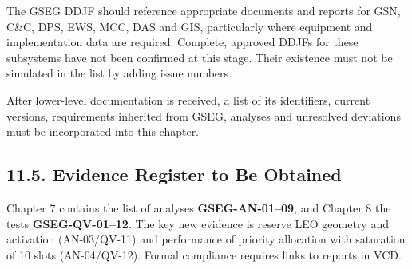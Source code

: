 The GSEG DDJF should reference appropriate documents and reports for GSN, C\&C, DPS, EWS, MCC, DAS and GIS, particularly where equipment and implementation data are required. Complete, approved DDJFs for these subsystems have not been confirmed at this stage. Their existence must not be simulated in the list by adding issue numbers.

After lower-level documentation is received, a list of its identifiers, current versions, requirements inherited from GSEG, analyses and unresolved deviations must be incorporated into this chapter.

\subsection{11.5. Evidence Register to Be Obtained}\label{ddjf-11-5}

Chapter 7 contains the list of analyses \textbf{GSEG-AN-01–09}, and Chapter 8 the tests \textbf{GSEG-QV-01–12}. The key new evidence is reserve LEO geometry and activation (AN-03/\allowbreak{}QV-11) and performance of priority allocation with saturation of 10 slots (AN-04/\allowbreak{}QV-12). Formal compliance requires links to reports in VCD.
